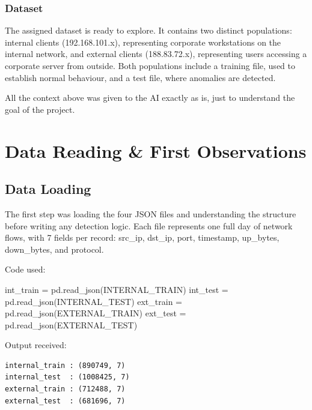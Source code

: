 \documentclass[
  11pt,
]{article}
\newenvironment{Shaded}{\vspace{4pt}}{\vspace{4pt}}
\newcommand{\NormalTok}[1]{#1}
\newcommand{\OperatorTok}[1]{\textcolor[rgb]{0.40,0.40,0.40}{#1}}
\begin{document}
\hypertarget{dataset}{%
\subsubsection{Dataset}\label{dataset}}

The assigned dataset is ready to explore. It contains two distinct
populations: internal clients (192.168.101.x), representing corporate
workstations on the internal network, and external clients
(188.83.72.x), representing users accessing a corporate server from
outside. Both populations include a training file, used to establish
normal behaviour, and a test file, where anomalies are detected.

\begin{aiprompt}
All the context above was given to the AI exactly as is, just to understand the goal of the project.
\end{aiprompt}

\hypertarget{data-reading-first-observations}{%
\section{Data Reading \& First
Observations}\label{data-reading-first-observations}}

\hypertarget{data-loading}{%
\subsection{Data Loading}\label{data-loading}}

The first step was loading the four JSON files and understanding the
structure before writing any detection logic. Each file represents one
full day of network flows, with 7 fields per record: src\_ip, dst\_ip,
port, timestamp, up\_bytes, down\_bytes, and protocol.

Code used:

\begin{Shaded}
\begin{Highlighting}[]
\NormalTok{int\_train }\OperatorTok{=}\NormalTok{ pd.read\_json(INTERNAL\_TRAIN)}
\NormalTok{int\_test  }\OperatorTok{=}\NormalTok{ pd.read\_json(INTERNAL\_TEST)}
\NormalTok{ext\_train }\OperatorTok{=}\NormalTok{ pd.read\_json(EXTERNAL\_TRAIN)}
\NormalTok{ext\_test  }\OperatorTok{=}\NormalTok{ pd.read\_json(EXTERNAL\_TEST)}
\end{Highlighting}
\end{Shaded}

Output received:

\begin{verbatim}
internal_train : (890749, 7)
internal_test  : (1008425, 7)
external_train : (712488, 7)
external_test  : (681696, 7)
\end{verbatim}
\end{document}
